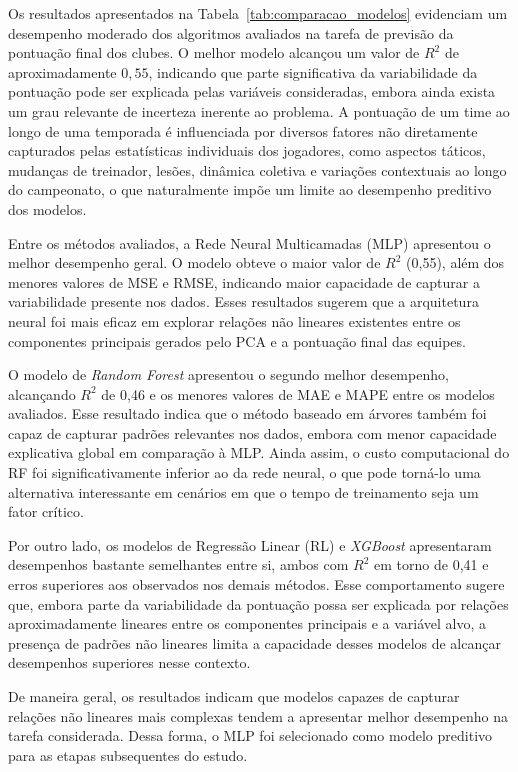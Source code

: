 Os resultados apresentados na Tabela~\ref{tab:comparacao_modelos} evidenciam um desempenho moderado dos algoritmos avaliados na tarefa de previsão da 
pontuação final dos clubes. O melhor modelo alcançou um valor de $R^2$ de aproximadamente $0{,}55$, indicando que parte significativa da variabilidade 
da pontuação pode ser explicada pelas variáveis consideradas, embora ainda exista um grau relevante de incerteza inerente ao problema. A pontuação de um time 
ao longo de uma temporada é influenciada por diversos fatores não diretamente capturados pelas estatísticas individuais dos jogadores, como aspectos táticos, 
mudanças de treinador, lesões, dinâmica coletiva e variações contextuais ao longo do campeonato, o que naturalmente impõe um limite ao desempenho preditivo dos modelos.

Entre os métodos avaliados, a Rede Neural Multicamadas (MLP) apresentou o melhor desempenho geral. O modelo obteve o maior valor de $R^2$ (0{,}55), além dos 
menores valores de MSE e RMSE, indicando maior capacidade de capturar a variabilidade presente nos dados. Esses resultados sugerem que a arquitetura neural foi 
mais eficaz em explorar relações não lineares existentes entre os componentes principais gerados pelo PCA e a pontuação final das equipes.

O modelo de \textit{Random Forest} apresentou o segundo melhor desempenho, alcançando $R^2$ de 0{,}46 e os menores valores de MAE e MAPE entre os 
modelos avaliados. Esse resultado indica que o método baseado em árvores também foi capaz de capturar padrões relevantes nos dados, embora com menor 
capacidade explicativa global em comparação à MLP. Ainda assim, o custo computacional do RF foi significativamente inferior ao da rede neural, o que pode 
torná-lo uma alternativa interessante em cenários em que o tempo de treinamento seja um fator crítico.

Por outro lado, os modelos de Regressão Linear (RL) e \textit{XGBoost} apresentaram desempenhos bastante semelhantes entre si, ambos com $R^2$ em torno de 0{,}41 
e erros superiores aos observados nos demais métodos. Esse comportamento sugere que, embora parte da variabilidade da pontuação possa ser explicada por relações 
aproximadamente lineares entre os componentes principais e a variável alvo, a presença de padrões não lineares limita a capacidade desses modelos de alcançar 
desempenhos superiores nesse contexto.

De maneira geral, os resultados indicam que modelos capazes de capturar relações não lineares mais complexas tendem a apresentar melhor desempenho na tarefa 
considerada. Dessa forma, o MLP foi selecionado como modelo preditivo para as etapas subsequentes do estudo.

